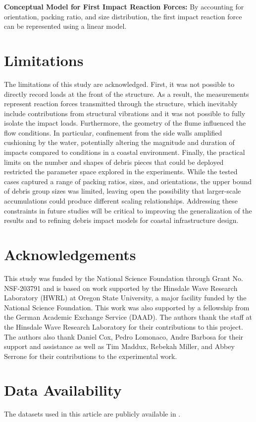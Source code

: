 \documentclass[10pt,a4paper]{article}
\begin{document}
\textbf{Conceptual Model for First Impact Reaction Forces:} By accounting for orientation, packing ratio, and size distribution, the first impact reaction force can be represented using a linear model.



\section{Limitations}
The limitations of this study are acknowledged. First, it was not possible to directly record loads at the front of the structure. As a result, the measurements represent reaction forces transmitted through the structure, which inevitably include contributions from structural vibrations and it was not possible to fully isolate the impact loads. Furthermore, the geometry of the flume influenced the flow conditions. In particular, confinement from the side walls amplified cushioning by the water, potentially altering the magnitude and duration of impacts compared to conditions in a coastal environment. Finally, the practical limits on the number and shapes of debris pieces that could be deployed restricted the parameter space explored in the experiments. While the tested cases captured a range of packing ratios, sizes, and orientations, the upper bound of debris group sizes was limited, leaving open the possibility that larger-scale accumulations could produce different scaling relationships. Addressing these constraints in future studies will be critical to improving the generalization of the results and to refining debris impact models for coastal infrastructure design.


\section{Acknowledgements}
This study was funded by the National Science Foundation through Grant No. NSF-203791 and is based on work supported by the Hinsdale Wave Research Laboratory (HWRL) at Oregon State University, a major facility funded by the National Science Foundation. This work was also supported by a fellowship from the German Academic Exchange Service (DAAD). The authors thank the staff at the Hinsdale Wave Research Laboratory for their contributions to this project. The authors also thank Daniel Cox, Pedro Lomonaco, Andre Barbosa for their support and assistance as well as Tim Maddux, Rebekah Miller, and Abbey Serrone for their contributions to the experimental work.

\section{Data Availability}
The datasets used in this article are publicly available in \citep{motleyHydrodynamic2Understanding2024a}. 
\end{document}
